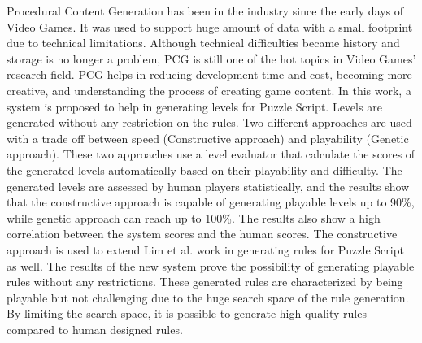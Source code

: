 Procedural Content Generation has been in the industry since the early days of Video Games. It was used to support huge amount of data with a small footprint due to technical limitations. Although technical difficulties became history and storage is no longer a problem, PCG is still one of the hot topics in Video Games' research field. PCG helps in reducing development time and cost, becoming more creative, and understanding the process of creating game content. In this work, a system is proposed to help in generating levels for Puzzle Script. Levels are generated without any restriction on the rules. Two different approaches are used with a trade off between speed (Constructive approach) and playability (Genetic approach). These two approaches use a level evaluator that calculate the scores of the generated levels automatically based on their playability and difficulty. The generated levels are assessed by human players statistically, and the results show that the constructive approach is capable of generating playable levels up to 90\%, while genetic approach can reach up to 100\%. The results also show a high correlation between the system scores and the human scores. The constructive approach is used to extend Lim et al. work in generating rules for Puzzle Script as well. The results of the new system prove the possibility of generating playable rules without any restrictions. These generated rules are characterized by being playable but not challenging due to the huge search space of the rule generation. By limiting the search space, it is possible to generate high quality rules compared to human designed rules.